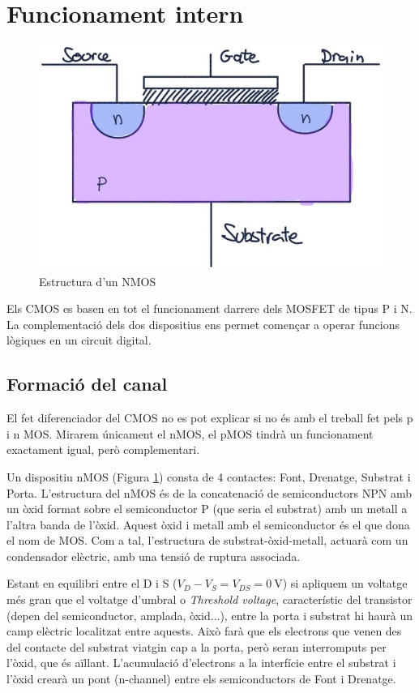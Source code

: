 \documentclass[11pt,a4paper]{article}
\begin{document}
\section{Funcionament intern}


\begin{figure}
    \centering
    \includegraphics[width=\linewidth]{images/nmos1.jpg}
    \caption{Estructura d'un NMOS}
    \label{fig:nmos1}
    \vspace{-1cm}
\end{figure}
Els CMOS es basen en tot el funcionament darrere dels MOSFET de tipus P i N. La complementació dels dos dispositius ens permet començar a operar funcions lògiques en un circuit digital.

\subsection{Formació del canal}

El fet diferenciador del CMOS no es pot explicar si no és amb el treball fet pels p i n MOS. Mirarem únicament el nMOS, el pMOS tindrà un funcionament exactament igual, però complementari.

Un dispositiu nMOS (Figura \ref{fig:nmos1}) consta de 4 contactes: Font, Drenatge, Substrat i Porta. L'estructura del nMOS és de la concatenació de semiconductors NPN amb un òxid format sobre el semiconductor P (que seria el substrat) amb un metall a l'altra banda de l'òxid. Aquest òxid i metall amb el semiconductor és el que dona el nom de MOS. Com a tal, l'estructura de substrat-òxid-metall, actuarà com un condensador elèctric, amb una tensió de ruptura associada.

Estant en equilibri entre el D i S ($V_D - V_S = V_{DS} = \qty{0}{\volt}$) si apliquem un voltatge més gran que el voltatge d'umbral o \textit{Threshold voltage}, característic del transistor (depen del semiconductor, amplada, òxid...), entre la porta i substrat hi haurà un camp elèctric localitzat entre aquests. Això farà que els electrons que venen des del contacte del substrat viatgin cap a la porta, però seran interromputs per l'òxid, que és aïllant. L'acumulació d'electrons a la interfície entre el substrat i l'òxid crearà un pont (n-channel) entre els semiconductors de Font i Drenatge.
\end{document}
